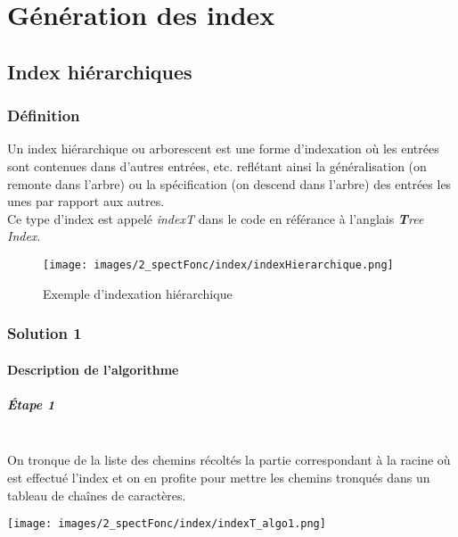 \documentclass[./standalone.tex]{subfiles}
\begin{document}
\chapter{Génération des index}

\section{Index hiérarchiques}

\subsection{Définition}
Un index hiérarchique ou arborescent est une forme d'indexation où les entrées sont contenues dans d'autres entrées, etc. reflétant ainsi la généralisation (on remonte dans l'arbre) ou la spécification (on descend dans l'arbre) des entrées les unes par rapport aux autres.\\

Ce type d'index est appelé \textit{indexT} dans le code en référance à l'anglais \textit{\textbf{T}ree Index}.\\

\begin{figure}[h!]
    \centering
    \texttt{[image: images/2\_spectFonc/index/indexHierarchique.png]}
    \caption{Exemple d'indexation hiérarchique}
    \label{fig:indexT}
\end{figure}

\newpage
\subsection{Solution 1}
\bigskip
\bigskip
\subsubsection{Description de l'algorithme\\}
\paragraph{Étape 1\\\\}

On tronque de la liste des chemins récoltés la partie correspondant à la racine où est effectué l'index et on en profite pour mettre les chemins tronqués dans un tableau de chaînes de caractères.\\

\begin{center}
\texttt{[image: images/2\_spectFonc/index/indexT\_algo1.png]}
\label{fig:indexT_algo1}
\end{center}
\end{document}
